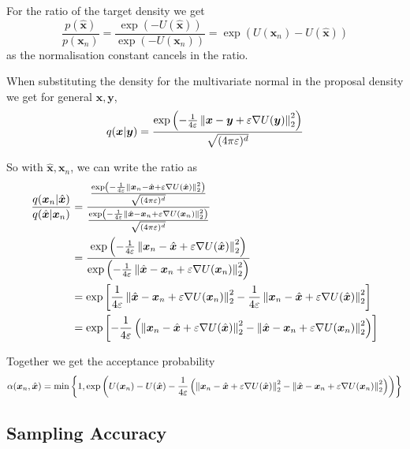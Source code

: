 For the ratio of the target density we get
\[
	\frac{ p(\hat{\bm{x}}) }{ p(\bm{x}_n) } = \frac{ \exp(-U(\hat{\bm{x}})) }{ \exp(-U(\bm{x}_n)) } = \exp( U(\bm{x}_n) - U(\hat{\bm{x}}) )
\]
as the normalisation constant cancels in the ratio.

When substituting the density for the multivariate normal in the proposal density we get for general $\bm{x}, \bm{y}$,
\[
	q(\bm{x} | \bm{y}) 
	= \frac
		{ \exp \left( -\frac{1}{4\varepsilon} \left\lVert\bm{x} - \bm{y} + \varepsilon \nabla U( \bm{y} ) \right\rVert_{2}^2 \right) }
		{ \sqrt{(4\pi \varepsilon)^d } }
\]

So with $\hat{\bm{x}}, \bm{x}_n$, we can write the ratio as
\[
\begin{aligned}
	\frac{ q(\bm{x}_n | \hat{\bm{x}}) }{ q(\hat{\bm{x}} | \bm{x}_n) }
	&= \frac
		{
			\frac
			{ \exp \left( -\frac{1}{4\varepsilon} \left\lVert\bm{x}_n - \hat{\bm{x}} + \varepsilon \nabla U( \hat{\bm{x}} ) \right\rVert_{2}^2 \right) }
			{ \sqrt{(4\pi \varepsilon)^d } }
		}
		{
			\frac
			{ \exp \left( -\frac{1}{4\varepsilon} \left\lVert\hat{\bm{x}} - \bm{x}_n + \varepsilon \nabla U( \bm{x}_n ) \right\rVert_{2}^2 \right) }
			{ \sqrt{(4\pi \varepsilon)^d } }
		} \\
	&= \frac
		{
			\exp \left( -\frac{1}{4\varepsilon}  \left\lVert\bm{x}_n - \hat{\bm{x}} + \varepsilon \nabla U( \hat{\bm{x}} ) \right\rVert_{2}^2\right)
		}
		{
			\exp \left( -\frac{1}{4\varepsilon} \left\lVert\hat{\bm{x}} - \bm{x}_n + \varepsilon \nabla U( \bm{x}_n ) \right\rVert_{2}^2 \right) 
		} \\
	&= \exp 
		\left[ 
			\frac{1}{4\varepsilon} \left\lVert\hat{\bm{x}} - \bm{x}_n + \varepsilon \nabla U( \bm{x}_n ) \right\rVert_{2}^2 
			-\frac{1}{4\varepsilon} \left\lVert\bm{x}_n - \hat{\bm{x}} + \varepsilon \nabla U( \hat{\bm{x}} ) \right\rVert_{2}^2 
		\right] \\
	&= \exp 
		\left[ 
			-\frac{1}{4\varepsilon} 
			\left( \left\lVert\bm{x}_n - \hat{\bm{x}} + \varepsilon \nabla U( \hat{\bm{x}} ) \right\rVert_{2}^2 - \left\lVert\hat{\bm{x}} - \bm{x}_n + \varepsilon \nabla U( \bm{x}_n ) \right\rVert_{2}^2  \right) 
		\right] \\
\end{aligned}
\]

Together we get the acceptance probability
\[
	\alpha( \bm{x}_n, \hat{\bm{x}} ) 
	= \min \left \{ 1, \exp \left(
		U(\bm{x}_n) - U(\hat{\bm{x}})
		-\frac{1}{4\varepsilon} 
		\left( \left\lVert\bm{x}_n - \hat{\bm{x}} + \varepsilon \nabla U( \hat{\bm{x}} ) \right\rVert_{2}^2 - \left\lVert\hat{\bm{x}} - \bm{x}_n + \varepsilon \nabla U( \bm{x}_n ) \right\rVert_{2}^2  \right)
		\right) 
	\right\}
\]


\subsection{Sampling Accuracy}

